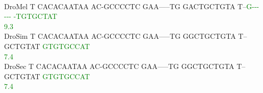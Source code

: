 \documentclass[11pt,twoside,reqno,a4paper]{article}
\begin{document}
{\\
DroMel	T	CACACAATAA	AC-GCCCCTC	GAA-----TG	GACTGCTGTA	T--\textcolor{Green}{G}\textcolor{Green}{-}\textcolor{Green}{-}\textcolor{Green}{-}\textcolor{Green}{-}\textcolor{Green}{-}\textcolor{Green}{-}	\textcolor{Green}{-}\textcolor{Green}{T}\textcolor{Green}{G}\textcolor{Green}{T}\textcolor{Green}{G}\textcolor{Green}{C}\textcolor{Green}{T}\textcolor{Green}{A}\textcolor{Green}{T}\\
\hspace*{7\charwidth}\hspace*{1\charwidth}\hspace*{1\charwidth}\hspace*{1\charwidth}\hspace*{1\charwidth}\hspace*{1\charwidth}\hspace*{44\charwidth}\textcolor{Green}{9.3}\hspace*{1\charwidth}\\
DroSim	T	CACACAATAA	AC-GCCCCTC	GAA-----TG	GGCTGCTGTA	T--GCTGTAT	\textcolor{Green}{G}\textcolor{Green}{T}\textcolor{Green}{G}\textcolor{Green}{T}\textcolor{Green}{G}\textcolor{Green}{C}\textcolor{Green}{C}\textcolor{Green}{A}\textcolor{Green}{T}\\
\hspace*{7\charwidth}\hspace*{1\charwidth}\hspace*{1\charwidth}\hspace*{1\charwidth}\hspace*{1\charwidth}\hspace*{1\charwidth}\hspace*{1\charwidth}\hspace*{51\charwidth}\textcolor{Green}{7.4}\\
DroSec	T	CACACAATAA	AC-GCCCCTC	GAA-----TG	GGCTGCTGTA	T--GCTGTAT	\textcolor{Green}{G}\textcolor{Green}{T}\textcolor{Green}{G}\textcolor{Green}{T}\textcolor{Green}{G}\textcolor{Green}{C}\textcolor{Green}{C}\textcolor{Green}{A}\textcolor{Green}{T}\\
\hspace*{7\charwidth}\hspace*{1\charwidth}\hspace*{1\charwidth}\hspace*{1\charwidth}\hspace*{1\charwidth}\hspace*{1\charwidth}\hspace*{1\charwidth}\hspace*{51\charwidth}\textcolor{Green}{7.4}\\
}
\end{document}
